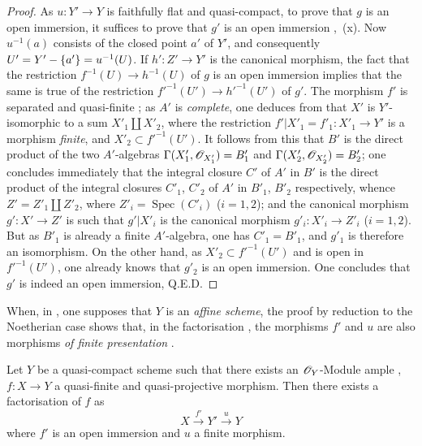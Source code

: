 \begin{proof}
As $u:Y'\to Y$ is faithfully flat and quasi-compact, to prove that $g$ is an open immersion, it suffices to prove that $g'$ is an open immersion ,~(x).
Now $u^{-1}(a)$ consists of the closed point $a'$ of $Y'$, and consequently $U'=Y'-\{a'\}=u^{-1}(U)$.
If $h':Z'\to Y'$ is the canonical morphism, the fact that the restriction $f^{-1}(U)\to h^{-1}(U)$ of $g$ is an open immersion implies that the same is true of the restriction $f'^{-1}(U')\to h'^{-1}(U')$ of $g'$.
The morphism $f'$ is separated and quasi-finite ; as $A'$ is \emph{complete}, one deduces from  that $X'$ is $Y'$-isomorphic to a sum $X'_1\amalg X'_2$, where the restriction $f'|X'_1=f'_1:X'_1\to Y'$ is a morphism \emph{finite}, and $X'_2\subset f'^{-1}(U')$.
It follows from this that $B'$ is the direct product of the two $A'$-algebras $\Gamma(X'_1,\mathscr{O}_{X'_1})=B'_1$ and $\Gamma(X'_2,\mathscr{O}_{X'_2})=B'_2$; one concludes immediately that the integral closure $C'$ of $A'$ in $B'$ is the direct product of the integral closures $C'_1$, $C'_2$ of $A'$ in $B'_1$, $B'_2$ respectively, whence $Z'=Z'_1\amalg Z'_2$, where $Z'_i=\operatorname{Spec}(C'_i)$ ($i=1,2$); and the canonical morphism $g':X'\to Z'$ is such that $g'|X'_i$ is the canonical morphism $g'_i:X'_i\to Z'_i$ ($i=1,2$).
But as $B'_1$ is already a finite $A'$-algebra, one has $C'_1=B'_1$, and $g'_1$ is therefore an isomorphism.
On the other hand, as $X'_2\subset f'^{-1}(U')$ and is open in $f'^{-1}(U')$, one
already knows that $g'_2$ is an open immersion.
One concludes that $g'$ is indeed an open immersion, Q.E.D.
\end{proof}

\begin{remark}[8.12.7]
\label{IV.8.12.7}
When, in , one supposes that $Y$ is an \emph{affine scheme}, the proof by reduction to the Noetherian case shows that, in the factorisation , the morphisms $f'$ and $u$ are also morphisms \emph{of finite presentation} .
\end{remark}

\begin{corollary}[8.12.8]
\label{IV.8.12.8}
Let $Y$ be a quasi-compact scheme such that there exists an $\mathscr{O}_Y$-Module ample , $f:X\to Y$ a quasi-finite and quasi-projective morphism.
Then there exists a factorisation of $f$ as
\[
X\xrightarrow{f'}Y'\xrightarrow{u}Y
\]
where $f'$ is an open immersion and $u$ a finite morphism.
\end{corollary}

